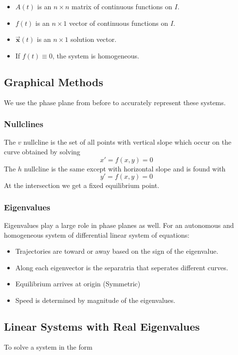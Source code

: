 \documentclass[12pt, landscape, twocolumn]{article}
\let\oldvec\vec
\renewcommand{\vec}[1]{\oldvec{\mathbf{ #1 } } }                    %
\begin{document}
    \begin{itemize}
        \item $A(t)$ is an $n \times n$ matrix of continuous functions on $I$.
        \item $f(t)$ is an $n \times 1$ vector of continuous functions on $I$.
        \item $\vec{x}(t)$ is an $n \times 1$ solution vector.
        \item If $f(t) \equiv 0$, the system is homogeneous.
    \end{itemize}

    \subsection{Graphical Methods}
    We use the phase plane from before to accurately represent these systems.

        \subsubsection{Nullclines}
        The $v$ nullcline is the set of all points with vertical slope which occur on the curve obtained by solving
            \[
                x\prime = f(x, y) = 0
            \]
        The $h$ nullcline is the same except with horizontal slope and is found with
            \[
                y\prime = f(x, y) = 0
            \]
        At the intersection we get a fixed equilibrium point.

        \subsubsection{Eigenvalues}
        Eigenvalues play a large role in phase planes as well. For an autonomous and homogeneous system of differential linear system of equations:

            \begin{itemize}
                \item Trajectories are toward or away based on the sign of the eigenvalue.
                \item Along each eigenvector is the separatria that seperates different curves.
                \item Equilibrium arrives at origin (Symmetric)
                \item Speed is determined by magnitude of the eigenvalues.
            \end{itemize}

    \subsection{Linear Systems with Real Eigenvalues}
    To solve a system in the form
\end{document}
